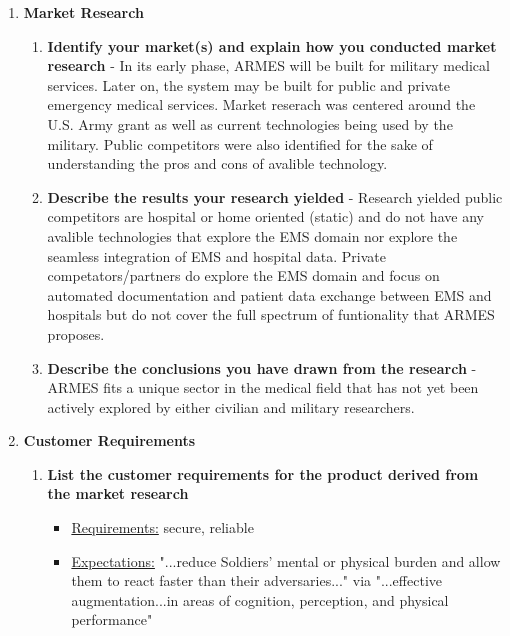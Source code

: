 \documentclass[man]{article}
\begin{document}
\begin{enumerate}
      \item \textbf{Market Research}
        \begin{enumerate}
          \item \textbf{Identify your market(s) and explain how you conducted market research} - In its early phase, ARMES will be built for military medical services. Later on, the system may be built for public and private emergency medical services. Market reserach was centered around the U.S. Army grant as well as current technologies being used by the military. Public competitors were also identified for the sake of understanding the pros and cons of avalible technology.

          \item \textbf{Describe the results your research yielded} - Research yielded public competitors are hospital or home oriented (static) and do not have any avalible technologies that explore the EMS domain nor explore the seamless integration of EMS and hospital data. Private competators/partners do explore the EMS domain and focus on automated documentation and patient data exchange between EMS and hospitals but do not cover the full spectrum of funtionality that ARMES proposes.

          \item \textbf{Describe the conclusions you have drawn from the research} - ARMES fits a unique sector in the medical field that has not yet been actively explored by either civilian and military researchers.
        \end{enumerate}

      \item \textbf{Customer Requirements}
        \begin{enumerate}
          \item \textbf{List the customer requirements for the product derived from the market research}
            \begin{itemize}
              \item \underline{Requirements:} secure, reliable
              \item \underline{Expectations:} "...reduce Soldiers’ mental or physical
              burden and allow them to react faster than their adversaries..." via "...effective augmentation...in areas of cognition, perception, and physical performance" \cite{usarmygrant}
            \end{itemize}


\end{enumerate}
\end{enumerate}
\end{document}
